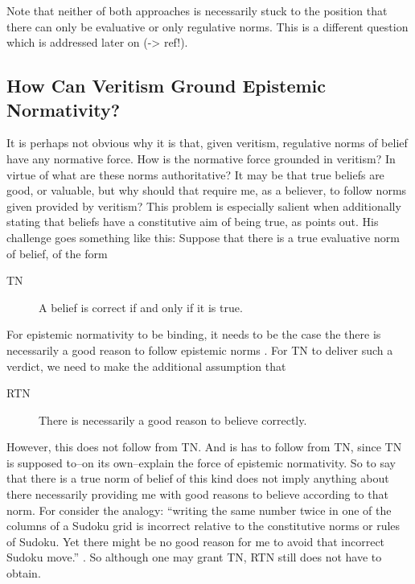 \documentclass[12pt,numbers=noenddot]{scrartcl}
\begin{document}
Note that neither of both approaches is necessarily stuck to the position that there can only be evaluative or only regulative norms. This is a different question which is addressed later on (-> ref!).

\subsection{How Can Veritism Ground Epistemic Normativity?}\label{sec:groundingnormativity}

It is perhaps not obvious why it is that, given veritism, regulative norms of belief have any normative force. How is the normative force grounded in veritism? In virtue of what are these norms authoritative? It may be that true beliefs are good, or valuable, but why should that require me, as a believer, to follow norms given provided by veritism? This problem is especially salient when additionally stating that beliefs have a constitutive aim of being true, as \textcite{Cote-BouchardForthcoming-CTBCTA} points out. His challenge goes something like this: Suppose that there is a true evaluative norm of belief, of the form
\begin{description}
    \item[TN] A belief is correct if and only if it is true. \autocite{Wedgwood2002-WEDTAO}
\end{description}
For epistemic normativity to be binding, it needs to be the case the there is necessarily a good reason to follow epistemic norms \textcite[13]{Cote-BouchardForthcoming-CTBCTA}. For TN to deliver such a verdict, we need to make the additional assumption that
\begin{description}
    \item[RTN] There is necessarily a good reason to believe correctly.
\end{description}
However, this does not follow from TN. And is has to follow from TN, since TN is supposed to–on its own–explain the force of epistemic normativity. So to say that there is a true norm of belief of this kind does not imply anything about there necessarily providing me with good reasons to believe according to that norm. For consider the analogy: “writing the same number twice in one of the columns of a Sudoku grid is incorrect relative to the constitutive norms or rules of Sudoku. Yet there might be no good reason for me to avoid that incorrect Sudoku move.” \autocite[12]{Cote-BouchardForthcoming-CTBCTA}. So although one may grant TN, RTN still does not have to obtain.
\end{document}
